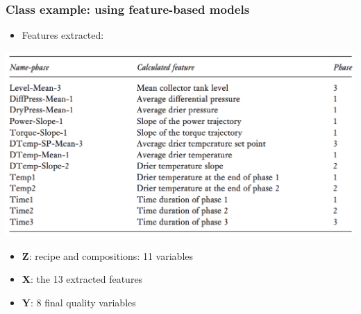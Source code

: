 \begin{frame}\frametitle{Class example: using feature-based models}

	\begin{itemize}
	
		\item	Features extracted:
	
	\end{itemize}

	\begin{center}
		\includegraphics[width=\textwidth]{images/fmc/fmc-features-extracted.png}
	\end{center}
	
	\begin{itemize}
		\item	\( \mathbf{Z} \): recipe and compositions: 11 variables
		
		\item	\( \mathbf{X} \): the 13 extracted features
		
		\item	\( \mathbf{Y} \): 8 final quality variables
	\end{itemize}
	

\end{frame}


